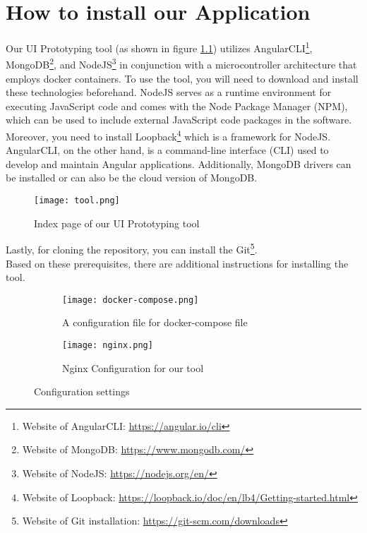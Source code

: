 \chapter{How to install our Application} 
\ifpdf
    \graphicspath{{Appendix1/Figs/}{Appendix1/Figs/}{Appendix1/Figs/}}
\else
    \graphicspath{{Appendix1/Figs/}{Appendix1/Figs/}}
\fi
Our UI Prototyping tool (as shown in figure \ref{fig:appendix:installation:tool}) utilizes AngularCLI\footnote{Website of AngularCLI: \url{https://angular.io/cli}}, MongoDB\footnote{Website of MongoDB: \url{https://www.mongodb.com/}}, and NodeJS\footnote{Website of NodeJS: \url{https://nodejs.org/en/}} in conjunction with a microcontroller architecture that employs docker containers. 
To use the tool, you will need to download and install these technologies beforehand.
NodeJS serves as a runtime environment for executing JavaScript code and comes with the Node Package Manager (NPM), which can be used to include external JavaScript code packages in the software. 
Moreover, you need to install Loopback\footnote{Website of Loopback: \url{https://loopback.io/doc/en/lb4/Getting-started.html}} which is a framework for NodeJS.
AngularCLI, on the other hand, is a command-line interface (CLI) used to develop and maintain Angular applications. 
Additionally, MongoDB drivers can be installed or can also be the cloud version of MongoDB. 
\begin{figure}[htbp!]
	\centering    
	\texttt{[image: tool.png]}
	\caption[UI Prototyping tool]{Index page of our UI Prototyping tool}
	\label{fig:appendix:installation:tool}
\end{figure}
Lastly, for cloning the repository, you can install the Git\footnote{Website of Git installation: \url{https://git-scm.com/downloads}}.\\
Based on these prerequisites, there are additional instructions for installing the tool.

\begin{figure}[htbp]
	\begin{subfigure}[b]{0.55\textwidth}
	  \centering
	  \texttt{[image: docker-compose.png]}
	\caption[Docker configuration]{A configuration file for docker-compose file}
	\label{fig:appendix:installation:dockerCompose}   
	\end{subfigure}
	\begin{subfigure}[b]{0.55\textwidth}
	  \centering
	  \texttt{[image: nginx.png]}
	\caption[Nginx Configuration]{Nginx Configuration for our tool}
	\label{fig:appendix:installation:nginx}
	\end{subfigure} 
	\caption{Configuration settings}
	\label{fig:appendix:configuration}
\end{figure}

